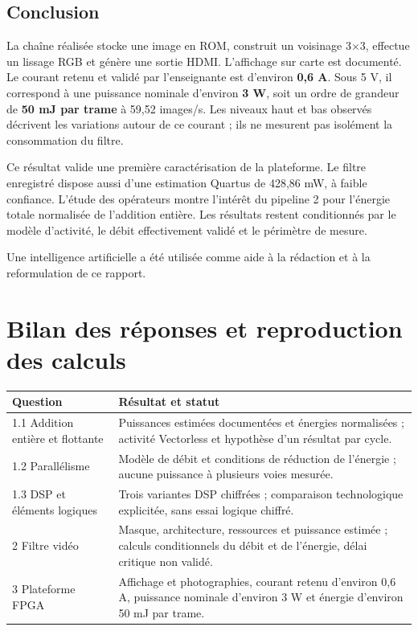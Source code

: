 \documentclass[11pt,a4paper]{article}
\begin{document}
\subsection{Conclusion}
La chaîne réalisée stocke une image en ROM, construit un voisinage 3$\times$3, effectue un lissage RGB et génère une sortie HDMI. L'affichage sur carte est documenté. Le courant retenu et validé par l'enseignante est d'environ \textbf{0,6 A}. Sous 5 V, il correspond à une puissance nominale d'environ \textbf{3 W}, soit un ordre de grandeur de \textbf{50 mJ par trame} à 59,52 images/s. Les niveaux haut et bas observés décrivent les variations autour de ce courant ; ils ne mesurent pas isolément la consommation du filtre.

Ce résultat valide une première caractérisation de la plateforme. Le filtre enregistré dispose aussi d'une estimation Quartus de 428,86 mW, à faible confiance. L'étude des opérateurs montre l'intérêt du pipeline 2 pour l'énergie totale normalisée de l'addition entière. Les résultats restent conditionnés par le modèle d'activité, le débit effectivement validé et le périmètre de mesure.

Une intelligence artificielle a été utilisée comme aide à la rédaction et à la reformulation de ce rapport.

\newpage
\section{Bilan des réponses et reproduction des calculs}
\begin{center}
\begin{tabularx}{\linewidth}{@{}l X@{}}
\toprule
Question & Résultat et statut\\
\midrule
1.1 Addition entière et flottante & Puissances estimées documentées et énergies normalisées ; activité Vectorless et hypothèse d'un résultat par cycle.\\
1.2 Parallélisme & Modèle de débit et conditions de réduction de l'énergie ; aucune puissance à plusieurs voies mesurée.\\
1.3 DSP et éléments logiques & Trois variantes DSP chiffrées ; comparaison technologique explicitée, sans essai logique chiffré.\\
2 Filtre vidéo & Masque, architecture, ressources et puissance estimée ; calculs conditionnels du débit et de l'énergie, délai critique non validé.\\
3 Plateforme FPGA & Affichage et photographies, courant retenu d'environ 0,6 A, puissance nominale d'environ 3 W et énergie d'environ 50 mJ par trame.\\
\bottomrule
\end{tabularx}
\end{center}
\end{document}
